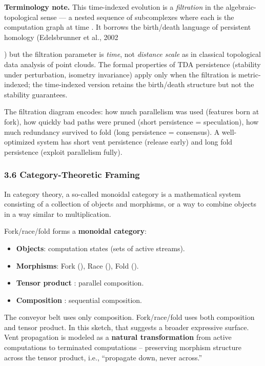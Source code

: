 \documentclass[
]{article}
\providecommand{\tightlist}{%
  \setlength{\itemsep}{0pt}\setlength{\parskip}{0pt}}
\begin{document}
\textbf{Terminology note.} This time-indexed evolution is a
\emph{filtration} in the algebraic-topological sense --- a nested
sequence of subcomplexes where each is the computation graph at time .
It borrows the birth/death language of persistent homology (Edelsbrunner
et al., 2002

) but the filtration parameter is \emph{time}, not \emph{distance scale}
as in classical topological data analysis of point clouds. The formal
properties of TDA persistence (stability under perturbation, isometry
invariance) apply only when the filtration is metric-indexed; the
time-indexed version retains the birth/death structure but not the
stability guarantees.

The filtration diagram encodes: how much parallelism was used (features
born at fork), how quickly bad paths were pruned (short persistence =
speculation), how much redundancy survived to fold (long persistence =
consensus). A well-optimized system has short vent persistence (release
early) and long fold persistence (exploit parallelism fully).

\subsubsection{\texorpdfstring{\textbf{3.6 Category-Theoretic
Framing}}{3.6 Category-Theoretic Framing}}\label{category-theoretic-framing}

In category theory, a so-called monoidal category is a mathematical
system consisting of a collection of objects and morphisms, or a way to
combine objects in a way similar to multiplication.

Fork/race/fold forms a \textbf{monoidal category}:

\begin{itemize}
\tightlist
\item
  \textbf{Objects}: computation states (sets of active streams).\\
\item
  \textbf{Morphisms}: Fork (), Race (), Fold ().\\
\item
  \textbf{Tensor product} : parallel composition.\\
\item
  \textbf{Composition} : sequential composition.
\end{itemize}

The conveyor belt uses only composition. Fork/race/fold uses both
composition and tensor product. In this sketch, that suggests a broader
expressive surface. Vent propagation is modeled as a \textbf{natural
transformation} from active computations to terminated computations --
preserving morphism structure across the tensor product, i.e.,
``propagate down, never across.''
\end{document}
